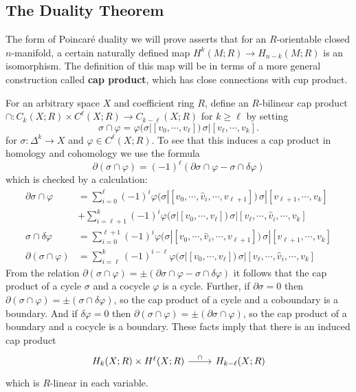 \subsection{The Duality Theorem}
The form of Poincar\'e duality we will prove asserts that for an $R$-orientable closed $n$-manifold, a certain naturally defined map $H^k(M;R)\to H_{n-k}(M;R)$ is an isomorphism. The definition of this map will be in terms of a more general construction called \textbf{cap product}, which has close connections with cup product.\par
For an arbitrary space $X$ and coefficient ring $R$, define an $R$-bilinear cap product $\cap:C_k(X;R)\times C^\ell(X;R)\to C_{k-\ell}(X;R)$ for $k\geq\ell$ by setting
\[\sigma\cap\varphi=\varphi(\sigma|[v_0,\cdots,v_\ell])\,\sigma|[v_\ell,\cdots,v_k].\]
for $\sigma:\Delta^k\to X$ and $\varphi\in C^\ell(X;R)$. To see that this induces a cap product in homology and cohomology we use the formula
\[\partial(\sigma\cap\varphi)=(-1)^\ell(\partial\sigma\cap\varphi-\sigma\cap\delta\varphi)\]
which is checked by a calculation:
\begin{align*}
\partial\sigma\cap\varphi&=\sum_{i=0}^{\ell}(-1)^i\varphi(\sigma|[v_0,\cdots,\widehat{v}_i,\cdots,v_{\ell+1}])\,\sigma|[v_{\ell+1},\cdots,v_k]\\
&+\sum_{i=\ell+1}^{k}(-1)^i\varphi(\sigma|[v_0,\cdots,v_\ell])\,\sigma|[v_\ell,\cdots,\widehat{v}_i,\cdots,v_k]\\
\sigma\cap\delta\varphi&=\sum_{i=0}^{\ell+1}(-1)^i\varphi(\sigma|[v_0,\cdots,\widehat{v}_i,\cdots,v_{\ell+1}])\,\sigma|[v_{\ell+1},\cdots,v_k]\\
\partial(\sigma\cap\varphi)&=\sum_{i=\ell}^{k}(-1)^{i-\ell}\varphi(\sigma|[v_0,\cdots,v_\ell])\,\sigma|[v_\ell,\cdots,\widehat{v}_i,\cdots,v_k]
\end{align*}
From the relation $\partial(\sigma\cap\varphi)=\pm(\partial\sigma\cap\varphi-\sigma\cap\delta\varphi)$ it follows that the cap product of a cycle $\sigma$ and a cocycle $\varphi$ is a cycle. Further, if $\partial\sigma=0$ then $\partial(\sigma\cap\varphi)=\pm(\sigma\cap\delta\varphi)$, so the cap product of a cycle and a coboundary is a boundary. And if $\delta\varphi=0$ then $\partial(\sigma\cap\varphi)=\pm(\partial\sigma\cap\varphi)$, so the cap product of a boundary and a cocycle is a boundary. These facts imply that there is an induced cap product
\[\begin{tikzcd}
H_k(X;R)\times H^\ell(X;R)\ar[r,"\cap"]&H_{k-\ell}(X;R)
\end{tikzcd}\]
which is $R$-linear in each variable.\par
